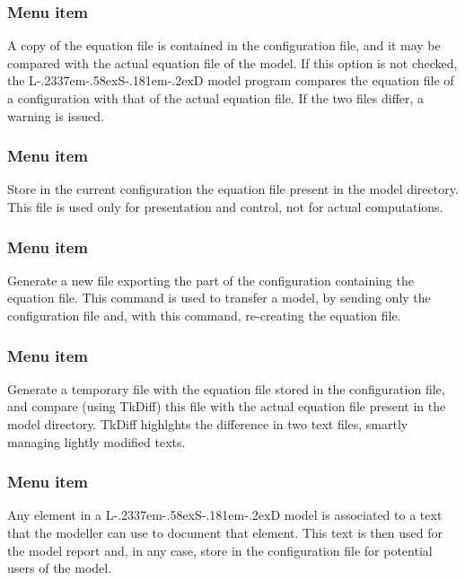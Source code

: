 \documentclass [11pt,a4paper] {book}
\def\LsD{{L\kern-.2337em\lower-.58ex\hbox{S}\kern-.181em\lower-.2ex\hbox{D}}\xspace}
\begin{document}
\subsubsection{Menu item  }

A copy of the equation file is contained in the configuration file, and it may be compared with the actual equation file of the model. If this option is not checked, the \LsD model program compares the equation file of a configuration with that of the actual equation file. If the two files differ, a warning is issued. 

\subsubsection{Menu item  }

Store in the current configuration the equation file present in the model directory. This file is used only for presentation and control, not for actual computations.


\subsubsection{Menu item  }

Generate a new file exporting the part of the configuration containing the equation file. This command is used to transfer a model, by sending only the configuration file and, with this command, re-creating the equation file.

\subsubsection{Menu item  }

Generate a temporary file with the equation file stored in the configuration file, and compare (using TkDiff) this file with the actual equation file present in the model directory. TkDiff highlghts the difference in two text files, smartly managing lightly modified texts.

\subsubsection{Menu item  }

Any element in a \LsD model is associated to a text that the modeller can use to document that element. This text is then used for the model report and, in any case, store in the configuration file for potential users of the model. 
\end{document}
